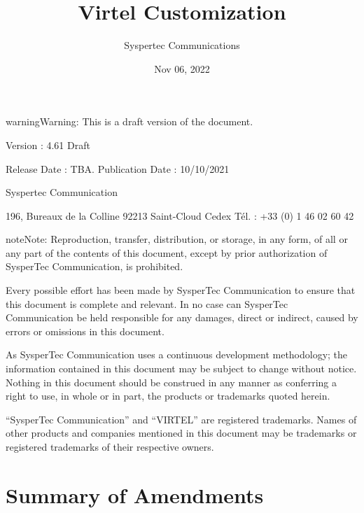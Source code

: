 \documentclass[letterpaper,10pt,english]{sphinxmanual}
\title{Virtel Customization}
\date{Nov 06, 2022}
\author{Syspertec Communications}
\begin{document}
\pagestyle{empty}
\sphinxmaketitle
\pagestyle{plain}
\sphinxtableofcontents
\pagestyle{normal}
\label{\detokenize{Customization::doc}}




\begin{sphinxadmonition}{warning}{Warning:}
This is a draft version of the document.
\end{sphinxadmonition}

Version : 4.61 Draft

Release Date : TBA. Publication Date : 10/10/2021

Syspertec Communication

196, Bureaux de la Colline 92213 Saint-Cloud Cedex Tél. : +33 (0) 1 46 02 60 42


\begin{sphinxadmonition}{note}{Note:}
Reproduction, transfer, distribution, or storage, in any form, of all or any part of
the contents of this document, except by prior authorization of SysperTec
Communication, is prohibited.

Every possible effort has been made by SysperTec Communication to ensure that this document
is complete and relevant. In no case can SysperTec Communication be held responsible for
any damages, direct or indirect, caused by errors or omissions in this document.

As SysperTec Communication uses a continuous development methodology; the information
contained in this document may be subject to change without notice. Nothing in this
document should be construed in any manner as conferring a right to use, in whole or in
part, the products or trademarks quoted herein.

“SysperTec Communication” and “VIRTEL” are registered trademarks. Names of other products
and companies mentioned in this document may be trademarks or registered trademarks of
their respective owners.
\end{sphinxadmonition}

\newpage


\chapter{Summary of Amendments}
\label{\detokenize{Customization:summary-of-amendments}}\label{\detokenize{Customization:virtel461cs-summary-of-amendments}}
\end{document}
